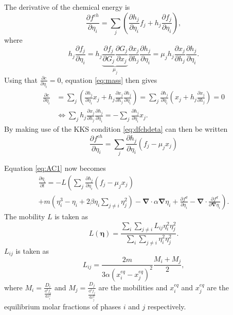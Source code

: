 \documentclass[12pt,a4paper]{article}
\newcommand{\partdiff}[2]{\frac{\partial#1}{\partial#2}}
\providecommand{\secdiff}[2]{\frac{\mathrm{d}^2#1}{\mathrm{d}#2^2}}
\providecommand{\vbf}[1]{\boldsymbol{#1}}
\providecommand{\gradient}[0]{\vbf{\nabla}}
\begin{document}
The derivative of the chemical energy is
\begin{equation}
  \partdiff{f^{ch}}{\eta_i}=\sum_j\left(\partdiff{h_j}{\eta_i}f_j+h_j\partdiff{f_j}{\eta_i}\right),
  \label{eq:dfchdeta}
\end{equation}
where
\begin{equation}
  h_j\partdiff{f_j}{\eta_i}=h_j\underbrace{\partdiff{f_j}{G_j}\partdiff{G_j}{x_j}}_{\mu_j}\partdiff{x_j}{h_j}\partdiff{h_j}{\eta_i} =\mu_jh_j\partdiff{x_j}{h_j}\partdiff{h_j}{\eta_i}.
\label{eq:dfjdetai}
\end{equation}
Using that $\partdiff{c}{\eta_i}=0$, equation \cref{eq:mass} then gives
\begin{equation}
\begin{aligned}
  \partdiff{c}{\eta_i}&=\sum_j\left(\partdiff{h_j}{\eta_i}x_j+h_j\partdiff{x_j}{h_j}\partdiff{h_j}{\eta_i}\right)=\sum_j\partdiff{h_j}{\eta_i}\left(x_j+h_j\partdiff{x_j}{h_j}\right)=0 \\
  &\iff \sum_jh_j\partdiff{x_j}{h_j}\partdiff{h_j}{\eta_i}=-\sum_j\partdiff{h_j}{\eta_i}x_j.
\end{aligned}
\end{equation} 
By making use of the KKS condition \cref{eq:dfchdeta} can then be written
\begin{equation}
  \partdiff{f^{ch}}{\eta_i}=\sum_j\partdiff{h_j}{\eta_i}\left(f_j-\mu_jx_j\right)
\end{equation}

Equation \cref{eq:AC1} now becomes
\begin{multline}
  \partdiff{\eta_i}{t}=-L\left(\sum_j\partdiff{h_j}{\eta_i}\left(f_j-\mu_jx_j\right)\right. \\
  \left.+m\left(\eta_i^3-\eta_i+2\beta\eta_i\sum_{j\ne i}\eta_j^2\right)-\gradient\cdot\alpha\gradient\eta_i+\partdiff{f^d}{\eta_i}-\gradient\cdot\partdiff{f^d}{\gradient\eta_i}\right).
  \label{eq:AC}
\end{multline}
The mobility $L$ is taken as
\begin{equation}
  L(\vbf{\eta})=\frac{\sum_i\sum_{j\ne i}L_{ij}\eta_i^2\eta_j^2}{\sum_i\sum_{j\ne i}\eta_i^2\eta_j^2}.
\end{equation} 
$L_{ij}$ is taken as 
\begin{equation}
  L_{ij}=\frac{2m}{3\alpha\left(x_i^{eq}-x_j^{eq}\right)^2}\frac{M_i+M_j}{2},
  \label{eq:lab}
\end{equation}
where $M_i=\frac{D_i}{\secdiff{f_i}{x_i}}$ and $M_j=\frac{D_j}{\secdiff{f_j}{x_j}}$ are the mobilities and $x_i^{eq}$ and $x_j^{eq}$ are the equilibrium molar fractions of phases $i$ and $j$ respectively.  
\end{document}
